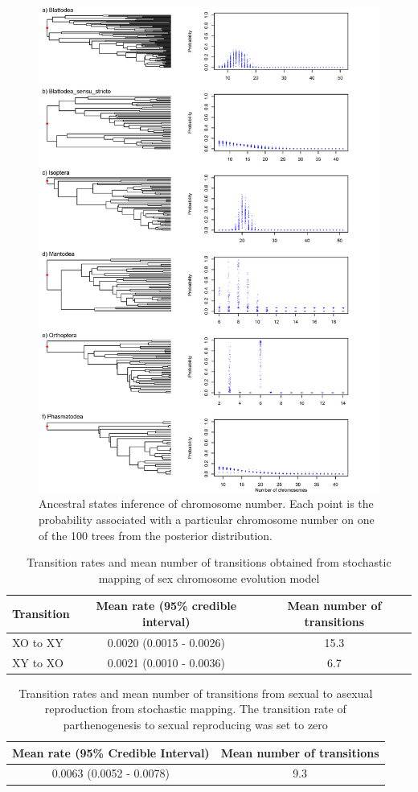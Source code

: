 \begin{figure}
\centering \includegraphics[width=.7\textwidth]{figures/asr_plot.jpg}
\caption{Ancestral states inference of chromosome number. Each point is the probability associated with a particular chromosome number on one of the 100 trees from the posterior distribution.}
\label{fig:asr}
\end{figure}

\begin{table}[ht]
\centering
\begin{tabular}{lcc}
\hline
\textbf{Transition} & \textbf{Mean rate (95\% credible interval)} & \textbf{Mean number of transitions} \\ \hline
XO to XY            & 0.0020 (0.0015 - 0.0026)                    & 15.3                                \\
XY to XO            & 0.0021 (0.0010 - 0.0036)                    & 6.7                                 \\ \hline
\end{tabular}
\caption{Transition rates and mean number of transitions obtained from stochastic mapping of sex chromosome evolution model}
\label{tab:simmap.summary}
\end{table}


\begin{table}
\centering
\begin{tabular}{ll}
\hline
\textbf{Mean rate (95\% Credible Interval)}  & \textbf{Mean number of transitions} \\ \hline
\multicolumn{1}{c}{0.0063 (0.0052 - 0.0078)} & \multicolumn{1}{c}{9.3}             \\ \hline
\end{tabular}
\caption{Transition rates and mean number of transitions from sexual to asexual reproduction from stochastic mapping. The transition rate of parthenogenesis to sexual reproducing was set to zero}
\label{tab:phas.simmap.summary}
\end{table}


